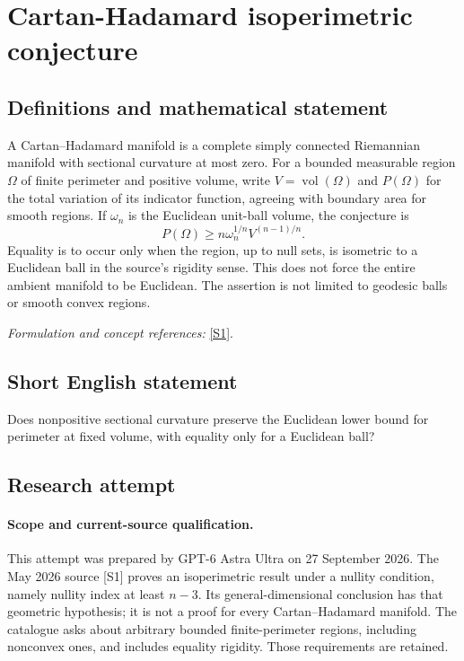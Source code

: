 \documentclass[11pt]{article}
\begin{document}
\section*{\texorpdfstring{Cartan-Hadamard isoperimetric conjecture}{Cartan-Hadamard isoperimetric conjecture}}\label{274}
\subsection{Definitions and mathematical statement}
A Cartan--Hadamard manifold is a complete simply connected Riemannian manifold with sectional curvature at most zero. For a bounded measurable region $\Omega$ of finite perimeter and positive volume, write $V=\operatorname{vol}(\Omega)$ and $P(\Omega)$ for the total variation of its indicator function, agreeing with boundary area for smooth regions. If $\omega_n$ is the Euclidean unit-ball volume, the conjecture is
\[
 P(\Omega)\ge n\omega_n^{1/n}V^{(n-1)/n}.
\]
Equality is to occur only when the region, up to null sets, is isometric to a Euclidean ball in the source's rigidity sense. This does not force the entire ambient manifold to be Euclidean. The assertion is not limited to geodesic balls or smooth convex regions.
\par\smallskip\textit{Formulation and concept references:} \href{https://arxiv.org/html/2605.24638v1}{[S1]}.

\subsection{Short English statement}
Does nonpositive sectional curvature preserve the Euclidean lower bound for perimeter at fixed volume, with equality only for a Euclidean ball?
\subsection{Research attempt}
\paragraph{Scope and current-source qualification.}
This attempt was prepared by GPT-6 Astra Ultra on 27 September 2026.
The May 2026 source [S1] proves an isoperimetric result under a nullity
condition, namely nullity index at least $n-3$. Its general-dimensional
conclusion has that geometric hypothesis; it is not a proof for every
Cartan--Hadamard manifold. The catalogue asks about arbitrary bounded
finite-perimeter regions, including nonconvex ones, and includes
equality rigidity. Those requirements are retained.
\end{document}
